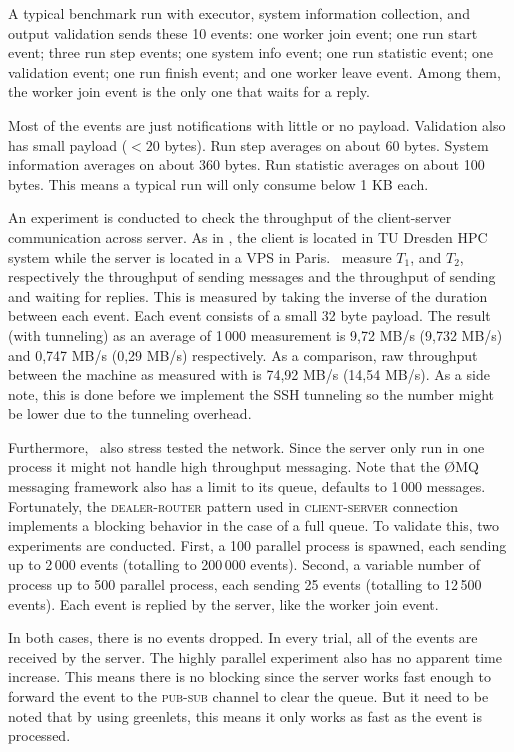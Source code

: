 A typical benchmark run with executor, system information collection, and output validation sends these 10 events:
one worker join event;
one run start event;
three run step events;
one system info event;
one run statistic event;
one validation event;
one run finish event;
and one worker leave event.
Among them, the worker join event is the only one that waits for a reply.

Most of the events are just notifications with little or no payload.
Validation also has small payload ($< 20$ bytes).
Run step averages on about 60 bytes.
System information averages on about 360 bytes.
Run statistic averages on about 100 bytes.
This means a typical run will only consume below 1 KB each.

An experiment is conducted to check the throughput of the client-server communication across server.
As in , the client is located in TU Dresden HPC system while the server is located in a VPS in Paris.
\First~measure \(T_1\), and \(T_2\), respectively the throughput of sending messages and the throughput of sending and waiting for replies.
This is measured by taking the inverse of the duration between each event.
Each event consists of a small 32 byte payload.
The result (with tunneling) as an average of 1\,000 measurement is 9,72 MB/s (9,732 MB/s) and 0,747 MB/s (0,29 MB/s) respectively.
As a comparison, raw throughput between the machine as measured with  is 74,92 MB/s (14,54 MB/s).
As a side note, this is done before we implement the SSH tunneling so the number might be lower due to the tunneling overhead.

Furthermore, \first~also stress tested the network.
Since the server only run in one process it might not handle high throughput messaging.
Note that the \O MQ messaging framework also has a limit to its queue, defaults to 1\,000 messages.
Fortunately, the \textsc{dealer-router} pattern used in \textsc{client-server} connection implements a blocking behavior in the case of a full queue.
To validate this, two experiments are conducted.
First, a 100 parallel process is spawned, each sending up to 2\,000 events (totalling to 200\,000 events).
Second, a variable number of process up to 500 parallel process, each sending 25 events (totalling to 12\,500 events).
Each event is replied by the server, like the worker join event.

In both cases, there is no events dropped.
In every trial, all of the events are received by the server.
The highly parallel experiment also has no apparent time increase.
This means there is no blocking since the server works fast enough to forward the event to the \textsc{pub}-\textsc{sub} channel to clear the queue.
But it need to be noted that by using greenlets, this means it only works as fast as the event is processed.



